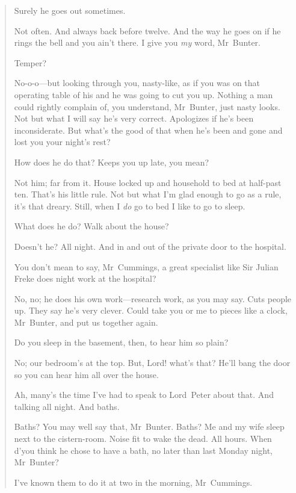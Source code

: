 \begin{quotation}
\begin{dialogue}
 Surely he goes out sometimes.

 Not often. And always back before twelve. And the way he goes on if he rings the bell and you ain't there. I give you \textit{my} word, Mr~Bunter.

 Temper?

 No-o-o—but looking through you, nasty-like, as if you was on that operating table of his and he was going to cut you up. Nothing a man could rightly complain of, you understand, Mr~Bunter, just nasty looks. Not but what I will say he's very correct. Apologizes if he's been inconsiderate. But what's the good of that when he's been and gone and lost you your night's rest?

 How does he do that? Keeps you up late, you mean?

 Not him; far from it. House locked up and household to bed at half-past ten. That's his little rule. Not but what I'm glad enough to go as a rule, it's that dreary. Still, when I \textit{do} go to bed I like to go to sleep.

 What does he do? Walk about the house?

 Doesn't he? All night. And in and out of the private door to the hospital.

 You don't mean to say, Mr~Cummings, a great specialist like Sir Julian Freke does night work at the hospital?

 No, no; he does his own work—research work, as you may say. Cuts people up. They say he's very clever. Could take you or me to pieces like a clock, Mr~Bunter, and put us together again.

 Do you sleep in the basement, then, to hear him so plain?

 No; our bedroom's at the top. But, Lord! what's that? He'll bang the door so you can hear him all over the house.

 Ah, many's the time I've had to speak to Lord~Peter about that. And talking all night. And baths.

 Baths? You may well say that, Mr~Bunter. Baths? Me and my wife sleep next to the cistern-room. Noise fit to wake the dead. All hours. When d'you think he chose to have a bath, no later than last Monday night, Mr~Bunter?

 I've known them to do it at two in the morning, Mr~Cummings.


\end{dialogue}
\end{quotation}
